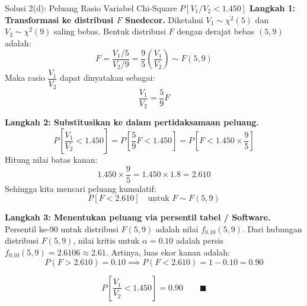 \documentclass[10pt,twoside]{article}
\begin{document}
\begin{solbox}{Solusi 2(d): Peluang Rasio Variabel Chi-Square $P[V_1 / V_2 < 1.450]$}
\textbf{Langkah 1: Transformasi ke distribusi $F$ Snedecor.}
Diketahui $V_1 \sim \chi^2(5)$ dan $V_2 \sim \chi^2(9)$ saling bebas.
Bentuk distribusi $F$ dengan derajat bebas $(5, 9)$ adalah:
\[
F = \frac{V_1 / 5}{V_2 / 9} = \frac{9}{5} \left(\frac{V_1}{V_2}\right) \sim F(5, 9)
\]
Maka rasio $\dfrac{V_1}{V_2}$ dapat dinyatakan sebagai:
\[
\frac{V_1}{V_2} = \frac{5}{9} F
\]

\textbf{Langkah 2: Substitusikan ke dalam pertidaksamaan peluang.}
\[
P\left[\frac{V_1}{V_2} < 1.450\right] = P\left[\frac{5}{9} F < 1.450\right] = P\left[F < 1.450 \times \frac{9}{5}\right]
\]
Hitung nilai batas kanan:
\[
1.450 \times \frac{9}{5} = 1.450 \times 1.8 = 2.610
\]
Sehingga kita mencari peluang kumulatif:
\[
P[F < 2.610] \quad \text{untuk } F \sim F(5, 9)
\]

\textbf{Langkah 3: Menentukan peluang via persentil tabel / Software.}
Persentil ke-90 untuk distribusi $F(5, 9)$ adalah nilai $f_{0.10}(5, 9)$.
Dari hubungan distribusi $F(5, 9)$, nilai kritis untuk $\alpha = 0.10$ adalah persis $f_{0.10}(5, 9) = 2.6106 \approx 2.61$.
Artinya, luas ekor kanan adalah:
\[
P(F > 2.610) = 0.10 \implies P(F < 2.610) = 1 - 0.10 = 0.90
\]

\[
\boxed{P\left[\frac{V_1}{V_2} < 1.450\right] = 0.90} \qquad \blacksquare
\]
\end{solbox}
\end{document}

